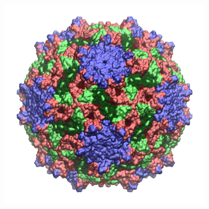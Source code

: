 \documentclass[8pt]{beamer}
\begin{document}
\begin{frame}[t]
\begin{minipage}[t]{0.4\textwidth}
{\begin{figure}[ht]
    \includegraphics[width=0.8\textwidth]{Figure/TrV_Capsid.png}
\end{figure}}
\end{minipage}
\end{frame}
\end{document}
